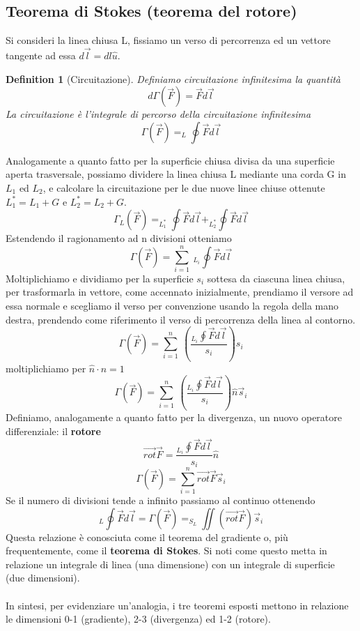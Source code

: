 \documentclass[10pt,a4paper]{article}
\newtheorem{definition}{Definition}
\begin{document}
\subsection{Teorema di Stokes (teorema del rotore)}
Si consideri la linea chiusa L, fissiamo un verso di percorrenza ed un vettore tangente ad essa $d\vec{l}= dl\hat{u}$. 
\begin{definition}[Circuitazione]
	Definiamo circuitazione infinitesima la quantità
	\[d\Gamma(\vec{F}) = \vec{F}d\vec{l}\]
	La circuitazione è l'integrale di percorso della circuitazione infinitesima
	\[\Gamma(\vec{F}) = _L\oint \vec{F}d\vec{l}\]
\end{definition}
Analogamente a quanto fatto per la superficie chiusa divisa da una superficie aperta trasversale, possiamo dividere la linea chiusa L mediante una corda G in \(L_1\) ed \(L_2\), e calcolare la circuitazione per le due nuove linee chiuse ottenute \(L_1^* = L_1+G\) e \(L_2^* = L_2+G\).
\[\Gamma_L(\vec{F}) = _{L_1^*}\oint \vec{F}d\vec{l}+_{L_2^*}\oint \vec{F}d\vec{l} \]
Estendendo il ragionamento ad n divisioni otteniamo
\[\Gamma(\vec{F}) = \sum_{i=1}^{n}\ _{L_i}\oint\vec{F}d\vec{l}\]
Moltiplichiamo e dividiamo per la superficie \(s_i\) sottesa da ciascuna linea chiusa, per trasformarla in vettore, come accennato inizialmente, prendiamo il versore ad essa normale e scegliamo il verso per convenzione usando la regola della mano destra, prendendo come riferimento il verso di percorrenza della linea al contorno.
\[\Gamma(\vec{F}) = \sum_{i=1}^{n}\ \left( \frac{_{L_i}\oint\vec{F}d\vec{l}}{s_i}\right)s_i\]
moltiplichiamo per \(\hat{n}\cdot\hat{n}=1\)
\[\Gamma(\vec{F}) = \sum_{i=1}^{n}\ \left( \frac{_{L_i}\oint\vec{F}d\vec{l}}{s_i}\right)\hat{n}\vec{s}_i\]
Definiamo, analogamente a quanto fatto per la divergenza, un nuovo operatore differenziale: il \textbf{rotore}
\[\vec{rot}\vec{F} = \frac{_{L_i}\oint\vec{F}d\vec{l}}{s_i}\hat{n}\]
\[\Gamma(\vec{F}) = \sum_{i=1}^{n}\vec{rot}\vec{F}\vec{s}_i \]
Se il numero di divisioni tende a infinito passiamo al continuo ottenendo
\[_L\oint\vec{F}d\vec{l} =\Gamma(\vec{F}) = _{S_L}\iint(\vec{rot}\vec{F})\vec{s}_i\]
Questa relazione è conosciuta come il teorema del gradiente o, più frequentemente, come il \textbf{teorema di Stokes}. Si noti come questo metta in relazione un integrale di linea (una dimensione) con un integrale di superficie (due dimensioni).\\\\
In sintesi, per evidenziare un'analogia, i tre teoremi esposti mettono in relazione le dimensioni 0-1 (gradiente), 2-3 (divergenza) ed 1-2 (rotore).
\end{document}
